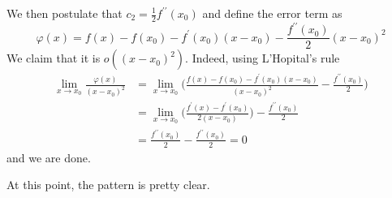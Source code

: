 \begin{enumerate}
      We then postulate that $c_2 = \frac{1}{2} f^{\prime\prime} (x_0)$ and define the error term as 
      \begin{equation}
        \varphi(x) = f(x) - f(x_0) - f^\prime (x_0) (x - x_0) - \frac{f^{\prime\prime} (x_0)}{2} (x - x_0)^2 
      \end{equation}
      We claim that it is $o((x - x_0)^2)$. Indeed, using L'Hopital's rule
      \begin{align}
        \lim_{x \to x_0} \frac{\varphi(x)}{(x - x_0)^2} & = \lim_{x \to x_0} \bigg( \frac{f(x) - f(x_0) - f^\prime (x_0) (x - x_0)}{(x - x_0)^2} - \frac{f^{\prime\prime}(x_0)}{2}\bigg) \\
                                                        & = \lim_{x \to x_0} \bigg( \frac{f^\prime(x) - f^\prime (x_0)}{2 (x - x_0)} \bigg) - \frac{f^{\prime\prime} (x_0)}{2} \\ 
                                                        & = \frac{f^{\prime\prime} (x_0)}{2} - \frac{f^{\prime\prime} (x_0)}{2} = 0 
      \end{align}
      and we are done. 
  \end{enumerate}

  At this point, the pattern is pretty clear. 

